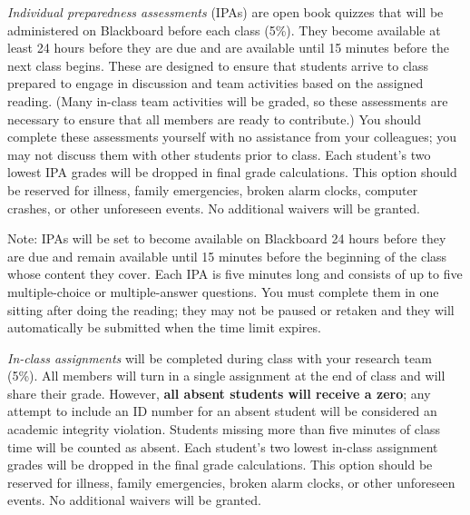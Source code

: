 \documentclass[11pt]{article}
\begin{document}
\vspace{.4cm}


\noindent \textit{Individual preparedness assessments} (IPAs) are open
book quizzes that will be administered on Blackboard
before each class (5\%). They become available at least 24 hours before they are due and are available until 15 minutes before the next class
begins. These are designed to ensure that students arrive to class
prepared to engage in discussion and team activities based on the
assigned reading.  (Many in-class team activities will be graded, so
these assessments are necessary to ensure that all members are ready
to contribute.)  You should complete these assessments yourself with
no assistance from your colleagues; you may not discuss them with
other students prior to class.  Each student's two lowest IPA grades
will be dropped in final grade calculations.  This option should be
reserved for illness, family emergencies, broken alarm clocks,
computer crashes, or other unforeseen events.  No additional waivers
will be granted.

Note: IPAs will be set to become available on Blackboard 24 hours
before they are due and remain available until 15 minutes before the
beginning of the class whose content they cover. Each IPA is five
minutes long and consists of up to five multiple-choice or
multiple-answer questions. You must complete them in one sitting after
doing the reading; they may not be paused or retaken and they will
automatically be submitted when the time limit expires.



\vspace{.4cm}
\noindent \textit{In-class assignments} will be completed during class
with your research team (5\%).  All members will turn in a single
assignment at the end of class and will share their grade. However,
\textbf{all absent students will receive a zero}; any attempt to
include an ID number for an absent student will be considered an
academic integrity violation. Students missing more than five minutes
of class time will be counted as absent.  Each student's two lowest
in-class assignment grades will be dropped in the final grade
calculations.  This option should be reserved for illness, family
emergencies, broken alarm clocks, or other unforeseen events.  No
additional waivers will be granted.
\end{document}
